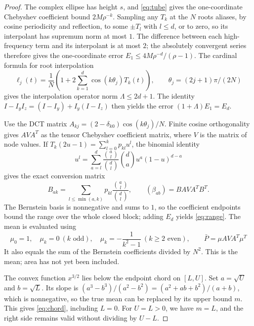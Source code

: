 \documentclass[11pt,a4paper]{article}
\theoremstyle{definition}\newtheorem{definition}[theorem]{Definition}
\theoremstyle{remark}\newtheorem{remark}[theorem]{Remark}
\begin{document}
\begin{proof}
The complex ellipse has height $s$, and \eqref{eq:tube} gives the one-coordinate Chebyshev coefficient bound $2M\rho^{-k}$. Sampling any $T_k$ at the $N$ roots aliases, by cosine periodicity and reflection, to some $\pm T_l$ with $l\le d$, or to zero, so its interpolant has supremum norm at most $1$. The difference between each high-frequency term and its interpolant is at most $2$; the absolutely convergent series therefore gives the one-coordinate error
$E_1\le4M\rho^{-d}/(\rho-1)$.
The cardinal formula for root interpolation
\[
 \ell_j(t)=\frac1N\left(1+2\sum_{k=1}^d\cos(k\theta_j)T_k(t)\right),
 \qquad\theta_j=(2j+1)\pi/(2N)
\]
gives the interpolation operator norm $\Lambda\le2d+1$. The identity
$I-I_yI_z=(I-I_y)+I_y(I-I_z)$ then yields the error $(1+\Lambda)E_1=E_d$.

Use the DCT matrix
$A_{kj}=(2-\delta_{k0})\cos(k\theta_j)/N$.
Finite cosine orthogonality gives $AVA^T$ as the tensor Chebyshev coefficient matrix, where $V$ is the matrix of node values. If
$T_k(2u-1)=\sum_{l=0}^kp_{kl}u^l$, the binomial identity
\[
 u^l=\sum_{a=l}^d\frac{\binom al}{\binom dl}
 \binom da u^a(1-u)^{d-a}
\]
gives the exact conversion matrix
\begin{equation}\label{eq:Bernstein}
 B_{ak}=\sum_{l\le\min(a,k)}p_{kl}\frac{\binom al}{\binom dl},
 \qquad(\beta_{ab})=BAVA^TB^T.
\end{equation}
The Bernstein basis is nonnegative and sums to $1$, so the coefficient endpoints bound the range over the whole closed block; adding $E_d$ yields \eqref{eq:range}. The mean is evaluated using
\begin{equation}\label{eq:mean}
 \mu_0=1,\quad \mu_k=0\ (k\text{ odd}),\quad
 \mu_k=-\frac1{k^2-1}\ (k\ge2\text{ even}),\qquad
 \bar P=\mu AVA^T\mu^T
\end{equation}
It also equals the sum of the Bernstein coefficients divided by $N^2$. This is the mean; area has not yet been included.

The convex function $x^{3/2}$ lies below the endpoint chord on $[L,U]$. Set $a=\sqrt U$ and $b=\sqrt L$. Its slope is $(a^3-b^3)/(a^2-b^2)=(a^2+ab+b^2)/(a+b)$, which is nonnegative, so the true mean can be replaced by its upper bound $m$. This gives \eqref{eq:chord}, including $L=0$. For $U=L>0$, we have $m=L$, and the right side remains valid without dividing by $U-L$.
\end{proof}
\end{document}
